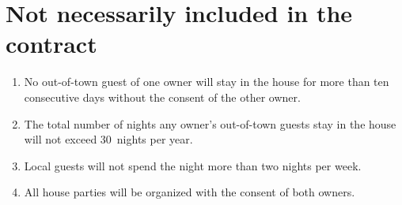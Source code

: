 \documentclass[12pt]{article}
\begin{document}
\section{Not necessarily included in the contract}
\begin{enumerate}

\item No out-of-town guest of one owner will stay in the house for 
more than ten consecutive days without the consent of the 
other owner.

\item The total number of nights any owner's out-of-town guests stay 
in the house will not exceed 30~nights per year.

\item Local guests will not spend the night more than two nights per 
week.

\item All house parties will be organized with the consent of both 
owners.

\end{enumerate}
\end{document}
